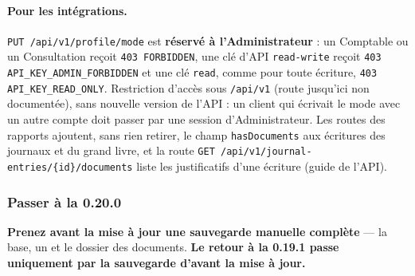 \documentclass[a4paper,11pt,oneside]{article}
\begin{document}
\begin{sloppypar}
\paragraph{Pour les intégrations.} \texttt{PUT /api/v1/profile/mode} est \textbf{réservé à l'Administrateur} : un Comptable ou un Consultation reçoit \texttt{403 FORBIDDEN}, une clé d'API \texttt{read-write} reçoit \texttt{403 API\_KEY\_ADMIN\_FORBIDDEN} et une clé \texttt{read}, comme pour toute écriture, \texttt{403 API\_KEY\_READ\_ONLY}. Restriction d'accès sous \texttt{/api/v1} (route jusqu'ici non documentée), sans nouvelle version de l'API : un client qui écrivait le mode avec un autre compte doit passer par une session d'Administrateur. Les routes des rapports ajoutent, sans rien retirer, le champ \texttt{hasDocuments} aux écritures des journaux et du grand livre, et la route \texttt{GET /api/v1/journal-entries/\allowbreak\{id\}/documents} liste les justificatifs d'une écriture (guide de l'API).
\end{sloppypar}

\fussy

\subsubsection{Passer à la 0.20.0}\label{sec:maj-0-20-0}
\sloppy

\textbf{Prenez avant la mise à jour une sauvegarde manuelle complète} --- la base, un  et le dossier des documents. \textbf{Le retour à la 0.19.1 passe uniquement par la sauvegarde d'avant la mise à jour.}
\end{document}
